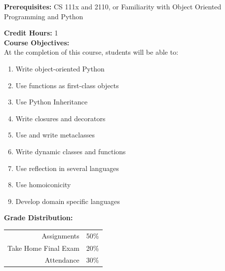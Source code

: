 \documentclass[11pt]{article}
\begin{document}
\textbf {Prerequisites:}  
CS 111x and 2110, 
or Familiarity with Object Oriented Programming and Python

\textbf {Credit Hours:} 1 \\

\textbf {\large Course Objectives:} \\
At the completion of this course, students will be able to:
\begin{enumerate} \itemsep-0.4em
  \item Write object-oriented Python
  \item Use functions as first-class objects
  \item Use Python Inheritance  
  \item Write closures and decorators
  \item Use and write metaclasses  
  \item Write dynamic classes and functions 
  \item Use reflection in several languages
  \item Use homoiconicity
  \item Develop domain specific languages
\end{enumerate}

\textbf {\large Grade Distribution:} \\
\hspace*{40mm}
\begin{tabular}{ r l }
Assignments & 50\% \\
Take Home Final Exam  & 20\% \\
Attendance  & 30\%
\end{tabular} \\\\

\newpage
\end{document}

